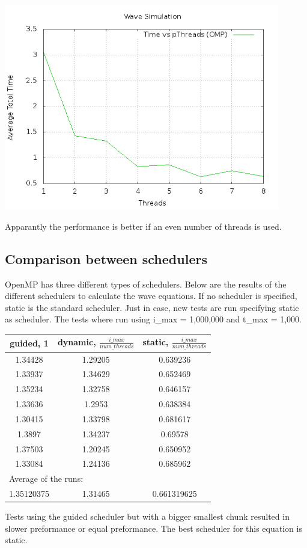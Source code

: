 \documentclass[a4paper]{article}
\begin{document}
    \begin{center}
      \includegraphics[width=0.9\textwidth]{speedplotsolo.png}
    \end{center}
    Apparantly the performance is better if an even number of threads is used.
  \newpage
  \subsection{Comparison between schedulers}
    OpenMP has three different types of schedulers.
    Below are the results of the different
    schedulers to calculate the wave equations. 
    If no scheduler is specified, static is the standard scheduler.
    Just in case, new tests are run specifying static as scheduler.
    The tests where run using i\_max = 1,000,000 and t\_max = 1,000.
    \begin{center}
      \begin{tabular}{| c | c | c |}
      \hline
      guided, 1 & dynamic, $\frac{i\_max}{num\_threads}$ & static, $\frac{i\_max}{num\_threads}$\\
      \hline
      1.34428 & 1.29205 & 0.639236\\
      \hline
      1.33937 & 1.34629 & 0.652469\\
      \hline
      1.35234 & 1.32758 & 0.646157\\
      \hline
      1.33636 & 1.2953 & 0.638384\\
      \hline
      1.30415 & 1.33798 & 0.681617\\
      \hline
      1.3897 & 1.34237 & 0.69578\\
      \hline
      1.37503 & 1.20245 & 0.650952\\
      \hline
      1.33084 & 1.24136 & 0.685962\\
      \hline
      \multicolumn{3}{|l|}{Average of the runs:}\\
      \hline
      1.35120375 & 1.31465 & 0.661319625\\
      \hline
      \end{tabular}
    \end{center}
    Tests using the guided scheduler but with a bigger smallest chunk resulted
    in slower preformance or equal preformance. The best scheduler for this equation
    is static.
    
\end{document}
